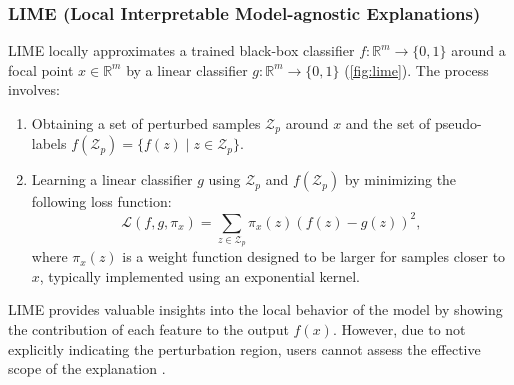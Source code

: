 \documentclass[11pt]{article}
\begin{document}
\subsubsection[LIME]{%
	LIME (Local Interpretable Model-agnostic Explanations)
	\cite{ribeiro2016why}
}
LIME locally
approximates a trained black-box classifier $f: \mathbb{R}^m \to \{0,1\}$
around a focal point $x \in \mathbb{R}^m$
by a linear classifier $g: \mathbb{R}^m \to \{0,1\}$
(\cref{fig:lime}).
The process involves:
\begin{enumerate}
	\item Obtaining a set of perturbed samples $\mathcal{Z}_p$ around $x$
	      and the set of pseudo-labels $f(\mathcal{Z}_p) = \{f(z) \mid z \in \mathcal{Z}_p\}$.
	\item Learning a linear classifier $g$
	      using $\mathcal{Z}_p$ and $f(\mathcal{Z}_p)$
	      by minimizing the following loss function:
	      \begin{equation}
		      \label{eq:lime_loss}
		      \mathcal{L}(f,g,\pi_x)=\sum_{z\in\mathcal{Z}_p}
		      \pi_x(z){\left(f(z)-g(z)\right)}^2,
	      \end{equation}
	      where $\pi_x(z)$ is a weight function designed to be larger for samples
	      closer to $x$, typically implemented using an exponential kernel.
\end{enumerate}
LIME provides valuable insights into the local behavior of the model
by showing the contribution of each feature to the output $f(x)$.
However, due to not explicitly indicating the perturbation region,
users cannot assess the effective scope of the explanation
\cite{ribeiro2018anchors}.
\end{document}

